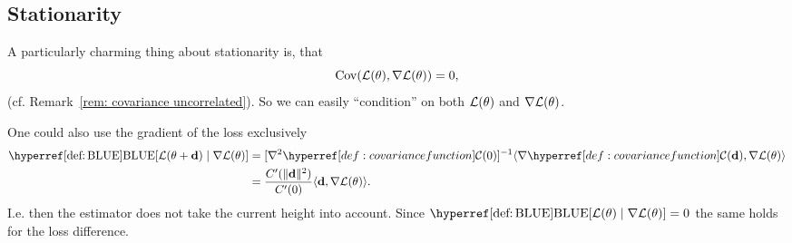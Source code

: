 \subsection{Stationarity}

A particularly charming thing about stationarity is, that
\[
	\operatorname{Cov}(\mathcal{L}(\theta), \nabla\mathcal{L}(\theta))=0,
\]
(cf. Remark~\ref{rem: covariance uncorrelated}). So we can easily ``condition''
on both \(\mathcal{L}(\theta)\) and \(\nabla\mathcal{L}(\theta)\).


\begin{remark}
	One could also use the gradient of the loss exclusively
	\begin{align*}
		\BLUE[\Loss(\param + \step)\mid \grad\Loss(\param)]
		&= [\grad^2\C(0)]^{-1}\langle\grad\C(\step), \grad\Loss(\param)\rangle\\
		&= \frac{\sqC'(\|\step\|^2)}{\sqC'(0)}\langle \step, \grad\Loss(\param)\rangle.
	\end{align*}
	I.e. then the estimator does not take the current height into account.
	Since \(\BLUE[\Loss(\param)\mid \grad\Loss(\param)]=0\) the same holds for
	the loss difference.
\end{remark}
